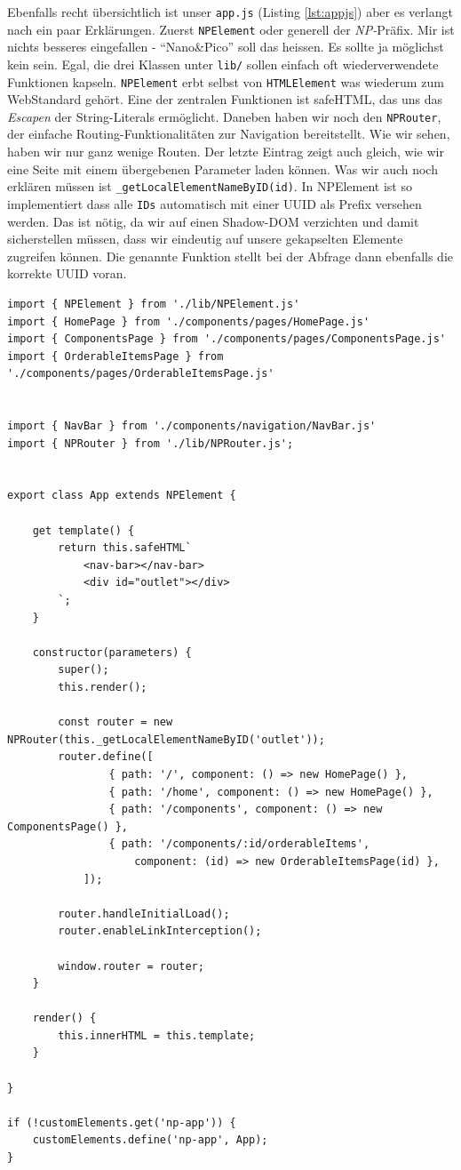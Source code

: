 Ebenfalls recht übersichtlich ist unser \texttt{app.js} 
(Listing \ref{lst:appjs}) aber es verlangt nach ein paar Erklärungen.
Zuerst \texttt{NPElement} oder generell der \textit{NP-}Präfix. Mir ist
nichts besseres eingefallen - ``Nano\&Pico'' soll das heissen. Es sollte
ja möglichst kein sein. Egal, die drei Klassen unter \texttt{lib/} sollen
einfach oft wiederverwendete Funktionen kapseln. \texttt{NPElement} erbt
selbst von \texttt{HTMLElement} was wiederum zum WebStandard gehört.
Eine der zentralen Funktionen ist safeHTML, das uns das \textit{Escapen} 
der String-Literals ermöglicht. Daneben haben wir noch den \texttt{NPRouter},
der einfache Routing-Funktionalitäten zur Navigation bereitstellt.
Wie wir sehen, haben wir nur ganz wenige Routen. Der letzte Eintrag
zeigt auch gleich, wie wir eine Seite mit einem übergebenen Parameter
laden können. Was wir auch noch erklären müssen ist
\texttt{\_getLocalElementNameByID(id)}. In NPElement ist so implementiert
dass alle \texttt{IDs} automatisch mit einer UUID als Prefix versehen werden.
Das ist nötig, da wir auf einen Shadow-DOM verzichten und damit sicherstellen
müssen, dass wir eindeutig auf unsere gekapselten Elemente zugreifen können.
Die genannte Funktion stellt bei der Abfrage dann ebenfalls die korrekte
UUID voran.  

\begin{listing}[H]
\begin{verbatim}
import { NPElement } from './lib/NPElement.js'
import { HomePage } from './components/pages/HomePage.js'
import { ComponentsPage } from './components/pages/ComponentsPage.js'
import { OrderableItemsPage } from './components/pages/OrderableItemsPage.js'


import { NavBar } from './components/navigation/NavBar.js'
import { NPRouter } from './lib/NPRouter.js';


export class App extends NPElement {

    get template() {
        return this.safeHTML`
            <nav-bar></nav-bar>
            <div id="outlet"></div> 
        `;
    }

    constructor(parameters) {
        super();
        this.render();

        const router = new NPRouter(this._getLocalElementNameByID('outlet'));
        router.define([
                { path: '/', component: () => new HomePage() },
                { path: '/home', component: () => new HomePage() },
                { path: '/components', component: () => new ComponentsPage() },                     
                { path: '/components/:id/orderableItems', 
                    component: (id) => new OrderableItemsPage(id) },           
            ]);

        router.handleInitialLoad();
        router.enableLinkInterception();

        window.router = router;
    }

    render() {
        this.innerHTML = this.template;
    }

}

if (!customElements.get('np-app')) {
    customElements.define('np-app', App);
}
\end{verbatim}
\caption{app.js}
\label{lst:appjs}
\end{listing}

